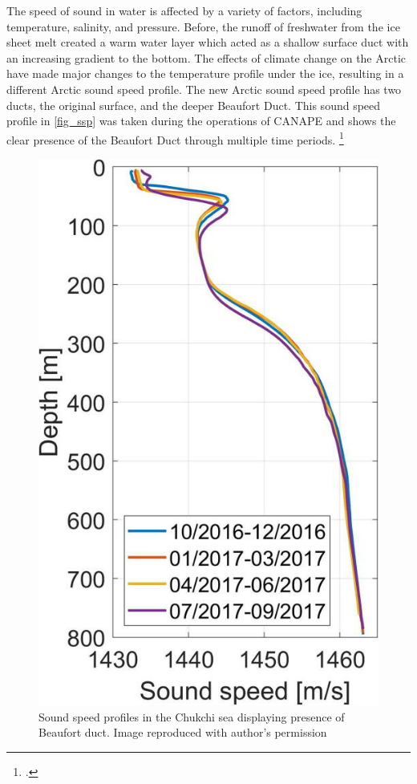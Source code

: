 The speed of sound in water is affected by a variety of factors, including temperature, salinity, and pressure. Before, the runoff of freshwater from the ice sheet melt created a warm water layer which acted as a shallow surface duct with an increasing gradient to the bottom. The effects of climate change on the Arctic have made major changes to the temperature profile under the ice, resulting in a different Arctic sound speed profile. The new Arctic sound speed profile has two ducts, the original surface, and the deeper Beaufort Duct. This sound speed profile in \autoref{fig_ssp} was taken during the operations of CANAPE and shows the clear presence of the Beaufort Duct through multiple time periods. \footcite[]{Bonnel2021} 

\begin{figure}[ht]
\centering
\includegraphics[scale=2]{Figures/ssp.jpeg}
\caption{Sound speed profiles in the Chukchi sea displaying presence of Beaufort duct. Image reproduced with author's permission}
\label{fig_ssp}
\end{figure}

